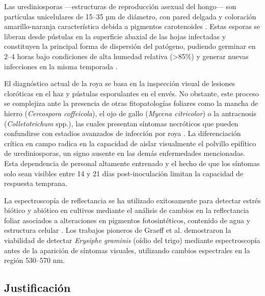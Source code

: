 \documentclass[12pt, a4paper]{article}
\begin{document}
	Las urediniosporas —estructuras de reproducción asexual del hongo— son partículas unicelulares de 15–35 µm de diámetro, con pared delgada y coloración amarillo-naranja característica debida a pigmentos carotenoides \parencite{Talhinhas2017}. Estas esporas se liberan desde pústulas en la superficie abaxial de las hojas infectadas y constituyen la principal forma de dispersión del patógeno, pudiendo germinar en 2–4 horas bajo condiciones de alta humedad relativa (>85\%) y generar nuevas infecciones en la misma temporada \parencite{Silva2006}.
	
	El diagnóstico actual de la roya se basa en la inspección visual de lesiones cloróticas en el haz y pústulas esporulantes en el envés. No obstante, este proceso se complejiza ante la presencia de otras fitopatologías foliares como la mancha de hierro (\textit{Cercospora coffeicola}), el ojo de gallo (\textit{Mycena citricolor}) o la antracnosis (\textit{Colletotrichum} spp.), las cuales presentan síntomas necróticos que pueden confundirse con estadios avanzados de infección por roya \parencite{Silva2006}. La diferenciación crítica en campo radica en la capacidad de aislar visualmente el polvillo epifítico de urediniosporas, un signo ausente en las demás enfermedades mencionadas. Esta dependencia de personal altamente entrenado y el hecho de que los síntomas solo sean visibles entre 14 y 21 días post-inoculación \parencite{Talhinhas2017} limitan la capacidad de respuesta temprana.
	
	La espectroscopía de reflectancia se ha utilizado exitosamente para detectar estrés biótico y abiótico en cultivos mediante el análisis de cambios en la reflectancia foliar asociados a alteraciones en pigmentos fotosintéticos, contenido de agua y estructura celular \parencite{Mahlein2016, Gold2020}. Los trabajos pioneros de Graeff et al. \parencite{Graeff2006} demostraron la viabilidad de detectar \textit{Erysiphe graminis} (oídio del trigo) mediante espectroscopía antes de la aparición de síntomas visuales, utilizando cambios espectrales en la región 530–570 nm.
	
	
	\subsection{Justificación}
	
\end{document}
